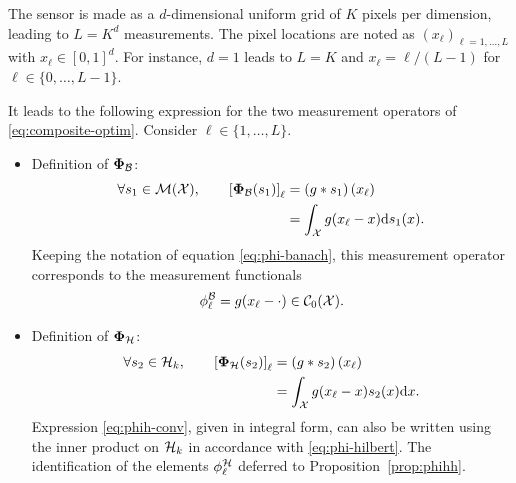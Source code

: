 \documentclass[12pt]{article}
\begin{document}
            The sensor is made as a $d$-dimensional uniform grid of $K$ pixels per dimension, leading to $L = K^d$ measurements. The pixel locations are noted as $(x_\ell)_{\ell = 1, \dots, L}$ with $x_\ell \in [0, 1]^d$. For instance, $d=1$ leads to $L=K$ and $x_\ell = {\ell}/({L-1})$ for $\ell \in \{0, \dots, L-1\}$.
        
            It leads to the following expression for the two measurement operators of \eqref{eq:composite-optim}. Consider $\ell \in \{1, \dots, L\}$.
            \begin{itemize}
                \item Definition of $\bm{\Phi}_\mathcal{B}$:
            \begin{equation}
                \label{eq:phib-conv}
                \begin{split}
                \forall s_1 \in {\mathcal{M}}({\mathcal{X}}), \qquad \left[\bm{\Phi}_\mathcal{B}(s_1)\right]_\ell &= \left(g*s_1\right)(x_\ell) \\
                &= \int_{\mathcal{X}} g(x_\ell - x) \mathrm{d}s_1(x).
            \end{split}
            \end{equation}
            Keeping the notation of equation \eqref{eq:phi-banach}, this measurement operator corresponds to the measurement functionals
            $$\phi^\mathcal{B}_\ell = g(x_\ell - \cdot) \in {\mathcal{C}}_0({\mathcal{X}}).$$
                \item Definition of $\bm{\Phi}_\mathcal{H}$:
            \begin{equation}
                \label{eq:phih-conv}
                \begin{split}
                \forall s_2 \in \mathcal{H}_k, \qquad\left[\bm{\Phi}_\mathcal{H}(s_2)\right]_\ell &= \left(g*s_2\right)(x_\ell) \\
                &= \int_{\mathcal{X}} g(x_\ell - x) s_2(x) \mathrm{d}x.
                \end{split}
            \end{equation}
            Expression \eqref{eq:phih-conv}, given in integral form, can also be written using the inner product on $\mathcal{H}_k$ in accordance with \eqref{eq:phi-hilbert}. The identification of the elements $\phi^\mathcal{H}_\ell$ deferred to Proposition~\ref{prop:phihh}.
            \end{itemize}
\end{document}
